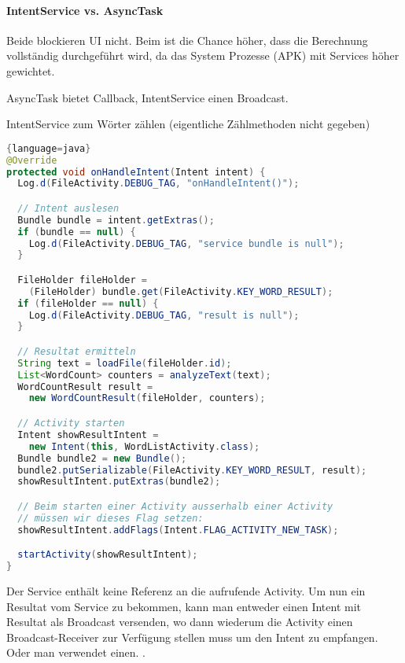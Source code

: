\paragraph{IntentService vs. AsyncTask}
Beide blockieren UI nicht. Beim  ist die Chance höher, dass die Berechnung vollständig durchgeführt wird, da das System Prozesse (APK) mit Services höher gewichtet.

AsyncTask bietet Callback, IntentService einen Broadcast.

IntentService zum Wörter zählen (eigentliche Zählmethoden nicht gegeben)
\begin{lstlisting}[language=java]{language=java}
@Override
protected void onHandleIntent(Intent intent) {
  Log.d(FileActivity.DEBUG_TAG, "onHandleIntent()");

  // Intent auslesen
  Bundle bundle = intent.getExtras();
  if (bundle == null) {
    Log.d(FileActivity.DEBUG_TAG, "service bundle is null");
  }

  FileHolder fileHolder =
    (FileHolder) bundle.get(FileActivity.KEY_WORD_RESULT);
  if (fileHolder == null) {
    Log.d(FileActivity.DEBUG_TAG, "result is null");
  }

  // Resultat ermitteln
  String text = loadFile(fileHolder.id);
  List<WordCount> counters = analyzeText(text);
  WordCountResult result = 
    new WordCountResult(fileHolder, counters);

  // Activity starten
  Intent showResultIntent =
    new Intent(this, WordListActivity.class);
  Bundle bundle2 = new Bundle();
  bundle2.putSerializable(FileActivity.KEY_WORD_RESULT, result);
  showResultIntent.putExtras(bundle2);

  // Beim starten einer Activity ausserhalb einer Activity
  // müssen wir dieses Flag setzen:
  showResultIntent.addFlags(Intent.FLAG_ACTIVITY_NEW_TASK);

  startActivity(showResultIntent);
}
\end{lstlisting}

Der Service enthält keine Referenz an die aufrufende Activity. Um nun ein Resultat vom Service zu bekommen, kann man entweder einen Intent mit Resultat als Broadcast versenden, wo dann wiederum die Activity einen Broadcast-Receiver zur Verfügung stellen muss um den Intent zu empfangen. Oder man verwendet einen. .
